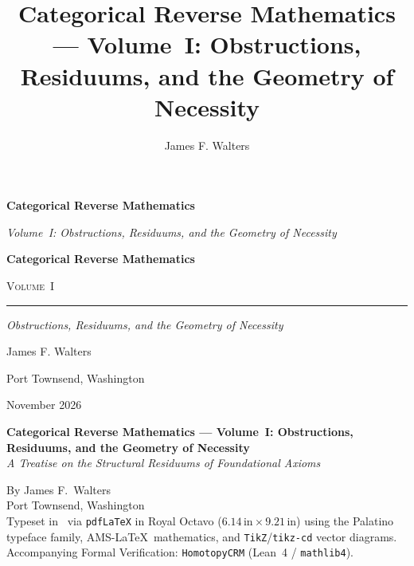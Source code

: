 \documentclass[10pt,twoside,openright]{book}
\title{Categorical Reverse Mathematics --- Volume~I: Obstructions, Residuums, and the Geometry of Necessity}
\author{James F. Walters}
\theoremstyle{crmplain}
\theoremstyle{crmdef}
\theoremstyle{crmremark}
\begin{document}
\frontmatter
\setcounter{secnumdepth}{-1}

\thispagestyle{empty}
\vspace*{0.28\textheight}
\begin{center}
  {\LARGE\bfseries Categorical Reverse Mathematics\par}
  \vspace{0.45em}
  {\large\itshape\color{CRMBlue} Volume~I: Obstructions, Residuums, and the Geometry of Necessity\par}
\end{center}
\cleardoublepage

\thispagestyle{empty}
{\centering
  \vspace*{0.14\textheight}
  {\Huge\bfseries Categorical Reverse Mathematics\par}
  \vspace{0.55em}
  {\Large\scshape\color{CRMBlue} Volume~I\par}
  \vspace{1.0em}
  {\color{CRMBlue}\noindent\rule{\textwidth}{0.8pt}}\par
  \vspace{1.0em}
  {\LARGE\itshape\color{CRMBlue} Obstructions, Residuums, and the Geometry of Necessity\par}
  \vfill
  {\large James F. Walters\par}
  \vspace{0.35em}
  {\normalsize Port Townsend, Washington\par}
  \vspace{0.6em}
  {\large November 2026\par}
  \vspace*{0.05\textheight}\par}
\clearpage

\thispagestyle{empty}
\vspace*{\fill}
\begingroup
\raggedright
\scriptsize
\setlength{\parskip}{0.10em}
\textbf{Categorical Reverse Mathematics --- Volume~I: Obstructions, Residuums, and the Geometry of Necessity}\\
\emph{A Treatise on the Structural Residuums of Foundational Axioms}

\vspace{0.18em}
\noindent By James F.\ Walters\\
Port Townsend, Washington\\
Typeset in \LaTeXe\ via \texttt{pdfLaTeX} in Royal Octavo ($6.14\,\mathrm{in} \times 9.21\,\mathrm{in}$) using the Palatino typeface family, AMS-\LaTeX\ mathematics, and \texttt{TikZ}/\texttt{tikz-cd} vector diagrams.\\
Accompanying Formal Verification: \texttt{HomotopyCRM} (Lean~4 / \texttt{mathlib4}).
\end{document}
